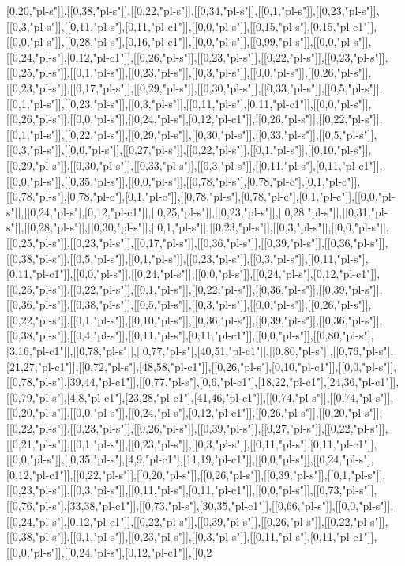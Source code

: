 [0,20,"pl-s"]],[[0,38,"pl-s"]],[[0,22,"pl-s"]],[[0,34,"pl-s"]],[[0,1,"pl-s"]],[[0,23,"pl-s"]],[[0,3,"pl-s"]],[[0,11,"pl-s"],[0,11,"pl-c1"]],[[0,0,"pl-s"]],[[0,15,"pl-s"],[0,15,"pl-c1"]],[[0,0,"pl-s"]],[[0,28,"pl-s"],[0,16,"pl-c1"]],[[0,0,"pl-s"]],[[0,99,"pl-s"]],[[0,0,"pl-s"]],[[0,24,"pl-s"],[0,12,"pl-c1"]],[[0,26,"pl-s"]],[[0,23,"pl-s"]],[[0,22,"pl-s"]],[[0,23,"pl-s"]],[[0,25,"pl-s"]],[[0,1,"pl-s"]],[[0,23,"pl-s"]],[[0,3,"pl-s"]],[[0,0,"pl-s"]],[[0,26,"pl-s"]],[[0,23,"pl-s"]],[[0,17,"pl-s"]],[[0,29,"pl-s"]],[[0,30,"pl-s"]],[[0,33,"pl-s"]],[[0,5,"pl-s"]],[[0,1,"pl-s"]],[[0,23,"pl-s"]],[[0,3,"pl-s"]],[[0,11,"pl-s"],[0,11,"pl-c1"]],[[0,0,"pl-s"]],[[0,26,"pl-s"]],[[0,0,"pl-s"]],[[0,24,"pl-s"],[0,12,"pl-c1"]],[[0,26,"pl-s"]],[[0,22,"pl-s"]],[[0,1,"pl-s"]],[[0,22,"pl-s"]],[[0,29,"pl-s"]],[[0,30,"pl-s"]],[[0,33,"pl-s"]],[[0,5,"pl-s"]],[[0,3,"pl-s"]],[[0,0,"pl-s"]],[[0,27,"pl-s"]],[[0,22,"pl-s"]],[[0,1,"pl-s"]],[[0,10,"pl-s"]],[[0,29,"pl-s"]],[[0,30,"pl-s"]],[[0,33,"pl-s"]],[[0,3,"pl-s"]],[[0,11,"pl-s"],[0,11,"pl-c1"]],[[0,0,"pl-s"]],[[0,35,"pl-s"]],[[0,0,"pl-s"]],[[0,78,"pl-s"],[0,78,"pl-c"],[0,1,"pl-c"]],[[0,78,"pl-s"],[0,78,"pl-c"],[0,1,"pl-c"]],[[0,78,"pl-s"],[0,78,"pl-c"],[0,1,"pl-c"]],[[0,0,"pl-s"]],[[0,24,"pl-s"],[0,12,"pl-c1"]],[[0,25,"pl-s"]],[[0,23,"pl-s"]],[[0,28,"pl-s"]],[[0,31,"pl-s"]],[[0,28,"pl-s"]],[[0,30,"pl-s"]],[[0,1,"pl-s"]],[[0,23,"pl-s"]],[[0,3,"pl-s"]],[[0,0,"pl-s"]],[[0,25,"pl-s"]],[[0,23,"pl-s"]],[[0,17,"pl-s"]],[[0,36,"pl-s"]],[[0,39,"pl-s"]],[[0,36,"pl-s"]],[[0,38,"pl-s"]],[[0,5,"pl-s"]],[[0,1,"pl-s"]],[[0,23,"pl-s"]],[[0,3,"pl-s"]],[[0,11,"pl-s"],[0,11,"pl-c1"]],[[0,0,"pl-s"]],[[0,24,"pl-s"]],[[0,0,"pl-s"]],[[0,24,"pl-s"],[0,12,"pl-c1"]],[[0,25,"pl-s"]],[[0,22,"pl-s"]],[[0,1,"pl-s"]],[[0,22,"pl-s"]],[[0,36,"pl-s"]],[[0,39,"pl-s"]],[[0,36,"pl-s"]],[[0,38,"pl-s"]],[[0,5,"pl-s"]],[[0,3,"pl-s"]],[[0,0,"pl-s"]],[[0,26,"pl-s"]],[[0,22,"pl-s"]],[[0,1,"pl-s"]],[[0,10,"pl-s"]],[[0,36,"pl-s"]],[[0,39,"pl-s"]],[[0,36,"pl-s"]],[[0,38,"pl-s"]],[[0,4,"pl-s"]],[[0,11,"pl-s"],[0,11,"pl-c1"]],[[0,0,"pl-s"]],[[0,80,"pl-s"],[3,16,"pl-c1"]],[[0,78,"pl-s"]],[[0,77,"pl-s"],[40,51,"pl-c1"]],[[0,80,"pl-s"]],[[0,76,"pl-s"],[21,27,"pl-c1"]],[[0,72,"pl-s"],[48,58,"pl-c1"]],[[0,26,"pl-s"],[0,10,"pl-c1"]],[[0,0,"pl-s"]],[[0,78,"pl-s"],[39,44,"pl-c1"]],[[0,77,"pl-s"],[0,6,"pl-c1"],[18,22,"pl-c1"],[24,36,"pl-c1"]],[[0,79,"pl-s"],[4,8,"pl-c1"],[23,28,"pl-c1"],[41,46,"pl-c1"]],[[0,74,"pl-s"]],[[0,74,"pl-s"]],[[0,20,"pl-s"]],[[0,0,"pl-s"]],[[0,24,"pl-s"],[0,12,"pl-c1"]],[[0,26,"pl-s"]],[[0,20,"pl-s"]],[[0,22,"pl-s"]],[[0,23,"pl-s"]],[[0,26,"pl-s"]],[[0,39,"pl-s"]],[[0,27,"pl-s"]],[[0,22,"pl-s"]],[[0,21,"pl-s"]],[[0,1,"pl-s"]],[[0,23,"pl-s"]],[[0,3,"pl-s"]],[[0,11,"pl-s"],[0,11,"pl-c1"]],[[0,0,"pl-s"]],[[0,35,"pl-s"],[4,9,"pl-c1"],[11,19,"pl-c1"]],[[0,0,"pl-s"]],[[0,24,"pl-s"],[0,12,"pl-c1"]],[[0,22,"pl-s"]],[[0,20,"pl-s"]],[[0,26,"pl-s"]],[[0,39,"pl-s"]],[[0,1,"pl-s"]],[[0,23,"pl-s"]],[[0,3,"pl-s"]],[[0,11,"pl-s"],[0,11,"pl-c1"]],[[0,0,"pl-s"]],[[0,73,"pl-s"]],[[0,76,"pl-s"],[33,38,"pl-c1"]],[[0,73,"pl-s"],[30,35,"pl-c1"]],[[0,66,"pl-s"]],[[0,0,"pl-s"]],[[0,24,"pl-s"],[0,12,"pl-c1"]],[[0,22,"pl-s"]],[[0,39,"pl-s"]],[[0,26,"pl-s"]],[[0,22,"pl-s"]],[[0,38,"pl-s"]],[[0,1,"pl-s"]],[[0,23,"pl-s"]],[[0,3,"pl-s"]],[[0,11,"pl-s"],[0,11,"pl-c1"]],[[0,0,"pl-s"]],[[0,24,"pl-s"],[0,12,"pl-c1"]],[[0,2